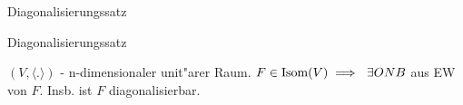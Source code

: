 \documentclass[class=article, crop=false]{standalone}
\begin{document}
\begin{zettel}{Diagonalisierungssatz}
\begin{flashcard}[dfan6g5o]{Diagonalisierungssatz}
	\begin{theorem}[Diagonalisierungssatz]
		$(V, \langle .\rangle) $ - n-dimensionaler unit"arer Raum. $F \in  \Isome(V) \implies \exists ONB$ aus EW von $F$. Insb. ist $F$ diagonalisierbar.
	\end{theorem}
\end{flashcard}
\end{zettel}
\end{document}
